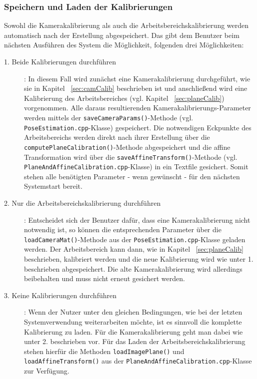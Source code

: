 \subsubsection{Speichern und Laden der Kalibrierungen}\label{sec:saveCalib}
Sowohl die Kamerakalibrierung als auch die Arbeitsbereichskalibrierung werden automatisch nach der Erstellung abgespeichert. Das gibt dem Benutzer beim nächsten Ausführen des System die Möglichkeit, folgenden drei Möglichkeiten: 
\begin{description}
	\item[1. Beide Kalibrierungen durchführen]: In diesem Fall wird zunächst eine Kamerakalibrierung durchgeführt, wie sie in Kapitel ~\ref{sec:camCalib} beschrieben ist und anschließend wird eine Kalibrierung des Arbeitsbereiches (vgl. Kapitel ~\ref{sec:planeCalib}) vorgenommen. Alle daraus resultierenden Kamerakalibrierungs-Parameter werden mittels der \texttt{save\-Camera\-Params()}-Methode (vgl. \texttt{Pose\-Estimation.cpp}-Klasse) gespeichert. Die notwendigen Eckpunkte des Arbeitsbereichs werden direkt nach ihrer Erstellung über die \texttt{compute\-Plane\-Calibration()}-Methode abgespeichert und die affine Transformation wird über die \texttt{save\-Affine\-Transform()}-Methode (vgl. \texttt{Plane\-And\-Affine\-Calibration.cpp}-Klasse) in ein Textfile gesichert. Somit stehen alle benötigten Parameter - wenn gewünscht - für den nächsten Systemstart bereit.
	
	\item[2. Nur die Arbeitsbereichskalibrierung durchführen]: Entscheidet sich der Benutzer dafür, dass eine Kamerakalibrierung nicht notwendig ist, so können die entsprechenden Parameter über die \texttt{load\-Camera\-Mat()}-Methode aus der \texttt{Pose\-Estimation.cpp}-Klasse geladen werden. Der Arbeitsbereich kann dann, wie in Kapitel ~\ref{sec:planeCalib} beschrieben, kalibriert werden und die neue Kalibrierung wird wie unter 1. beschrieben abgespeichert. Die alte Kamerakalibrierung wird allerdings beibehalten und muss nicht erneut gesichert werden. 
	
	\item[3. Keine Kalibrierungen durchführen]: Wenn der Nutzer unter den gleichen Bedingungen, wie bei der letzten Systemverwendung weiterarbeiten möchte, ist es sinnvoll die komplette Kalibrierung zu laden. Für die Kamerakalibrierung geht man dabei wie unter 2. beschrieben vor. Für das Laden der Arbeitsbereichskalibrierung stehen hierfür die Methoden \texttt{load\-Image\-Plane()} und \texttt{load\-Affine\-Transform()} aus der \texttt{Plane\-And\-Affine\-Calibration.cpp}-Klasse zur Verfügung.
\end{description}
